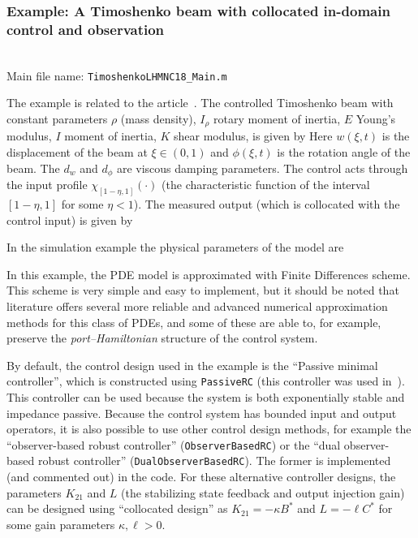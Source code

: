 \documentclass[11pt, a4paper]{amsart}
\theoremstyle{definition}
\numberwithin{equation}{section}
\begin{document}
\medskip

\subsubsection*{Example: A Timoshenko beam with collocated in-domain control and observation}
~\\[-1ex]

\noindent Main file name: \texttt{TimoshenkoLHMNC18\_Main.m}

\medskip

The example is related to the article~\cite{PauLeGLHMNC18}.
The controlled Timoshenko beam with constant parameters $\rho$ (mass density), $I_\rho$ rotary moment of inertia, $E$  Young's modulus, $I$ moment of inertia, $K$ shear modulus, is given by
Here $w(\xi,t)$ is the displacement of the beam at $\xi\in(0,1)$ and $\phi(\xi,t)$ is the rotation angle of the beam. The $d_w$ and $d_\phi$ are viscous damping parameters. 
The control acts through the input profile $\chi_{[1-\eta,1]}(\cdot)$ (the characteristic function of the interval $[1-\eta,1]$ for some $\eta<1$).
The measured output (which is collocated with the control input) is given by

In the simulation example the physical parameters of the model are 

In this example, the PDE model is approximated with Finite Differences scheme. This scheme is very simple and easy to implement, but it should be noted that literature offers several more reliable and advanced numerical approximation methods for this class of PDEs, and some of these are able to, for example, preserve the \emph{port--Hamiltonian} structure of the control system.

By default, the control design used in the example is the ``Passive minimal controller'', which is constructed using \texttt{PassiveRC} (this controller was used in~\cite{PauLeGLHMNC18}). This controller can be used because the system is both exponentially stable and impedance passive.
Because the control system has bounded input and output operators, it is also possible to use other control design methods, for example the ``observer-based robust controller'' (\texttt{ObserverBasedRC}) or the ``dual observer-based robust controller'' (\texttt{DualObserverBasedRC}). The former is implemented (and commented out) in the code. For these alternative controller designs, the parameters $K_{21}$ and $L$ (the stabilizing state feedback and output injection gain) can be designed using ``collocated design'' as $K_{21} = -\kappa B^\ast$ and $L=-\ell C^\ast$ for some gain parameters $\kappa,\ell>0$.
\end{document}
